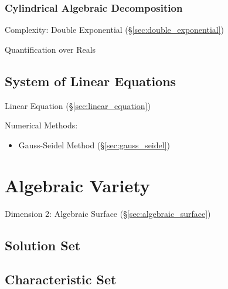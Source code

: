 \subsubsection{Cylindrical Algebraic Decomposition}
\label{sec:algebraic_decomposition}

Complexity: Double Exponential (\S\ref{sec:double_exponential})

Quantification over Reals



\subsection{System of Linear Equations}
\label{sec:system_of_linear_equations}

Linear Equation (\S\ref{sec:linear_equation})

Numerical Methods:
\begin{itemize}
  \item Gauss-Seidel Method (\S\ref{sec:gauss_seidel})
\end{itemize}



\section{Algebraic Variety}\label{sec:algebraic_variety}

Dimension 2: Algebraic Surface (\S\ref{sec:algebraic_surface})



\subsection{Solution Set}\label{sec:solution_set}

\subsection{Characteristic Set}\label{sec:characteristic_set}

